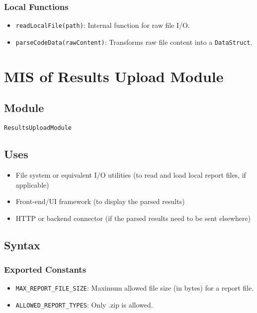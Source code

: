 \documentclass[12pt, titlepage]{article}
\begin{document}
\subsubsection{Local Functions}

\begin{itemize}
    \item \texttt{readLocalFile(path)}: Internal function for raw file I/O.
    \item \texttt{parseCodeData(rawContent)}: Transforms raw file content into a \texttt{DataStruct}.
\end{itemize}

\section{MIS of Results Upload Module} \label{mResultsUpload}

\subsection{Module}

\texttt{ResultsUploadModule}

\subsection{Uses}

\begin{itemize}
    \item File system or equivalent I/O utilities (to read and load local report files, if applicable)
    \item Front-end/UI framework (to display the parsed results)
    \item HTTP or backend connector (if the parsed results need to be sent elsewhere)
\end{itemize}

\subsection{Syntax}

\subsubsection{Exported Constants}

\begin{itemize}
    \item \texttt{MAX\_REPORT\_FILE\_SIZE}: Maximum allowed file size (in bytes) for a report file.
    \item \texttt{ALLOWED\_REPORT\_TYPES}: Only .zip is allowed.
\end{itemize}
\end{document}
